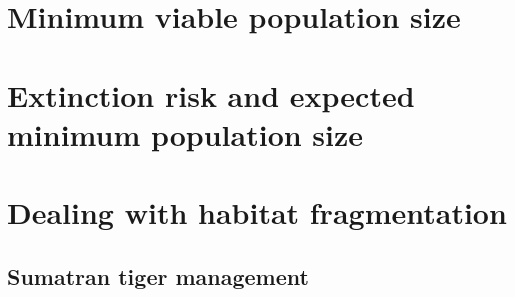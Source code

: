 \documentclass[]{book}
\theoremstyle{definition}
\theoremstyle{definition}
\theoremstyle{definition}
\theoremstyle{remark}
\begin{document}
\hypertarget{minimum-viable-population-size}{%
\section{Minimum viable population
size}\label{minimum-viable-population-size}}

\hypertarget{extinction-risk-and-expected-minimum-population-size}{%
\section{Extinction risk and expected minimum population
size}\label{extinction-risk-and-expected-minimum-population-size}}

\hypertarget{dealing-with-habitat-fragmentation}{%
\section{Dealing with habitat
fragmentation}\label{dealing-with-habitat-fragmentation}}

\hypertarget{sumatran-tiger-management}{%
\subsection{Sumatran tiger management}\label{sumatran-tiger-management}}


\end{document}
